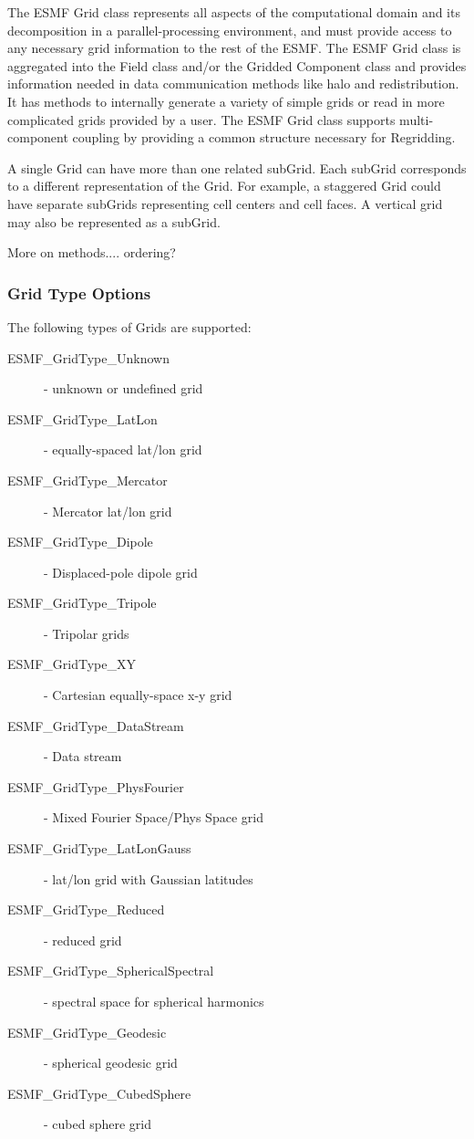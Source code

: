 %


The ESMF Grid class represents all aspects of the computational domain and its
decomposition in a parallel-processing environment, and must provide access to
any necessary grid information to the rest of the ESMF.  The ESMF Grid class
is aggregated into the Field class and/or the Gridded Component class
and provides information needed in data communication methods like halo and
redistribution.  It has methods to internally generate a variety of
simple grids or read in more complicated grids provided by a user.  The
ESMF Grid class supports multi-component coupling by providing a common
structure necessary for Regridding.

A single Grid can have more than one related subGrid.  Each subGrid corresponds to
a different representation of the Grid.  For example, a staggered Grid could
have separate subGrids representing cell centers and cell faces.  A vertical
grid may also be represented as a subGrid.

More on methods....   ordering?

\subsubsection{Grid Type Options}
The following types of Grids are supported:
\begin{description}
   \item[ESMF\_GridType\_Unknown] - unknown or undefined grid
   \item[ESMF\_GridType\_LatLon] - equally-spaced lat/lon grid
   \item[ESMF\_GridType\_Mercator] -  Mercator lat/lon grid
   \item[ESMF\_GridType\_Dipole] - Displaced-pole dipole grid
   \item[ESMF\_GridType\_Tripole] - Tripolar grids
   \item[ESMF\_GridType\_XY] - Cartesian equally-space x-y grid
   \item[ESMF\_GridType\_DataStream] - Data stream
   \item[ESMF\_GridType\_PhysFourier] - Mixed Fourier Space/Phys Space grid
   \item[ESMF\_GridType\_LatLonGauss] - lat/lon grid with Gaussian latitudes
   \item[ESMF\_GridType\_Reduced] - reduced grid
   \item[ESMF\_GridType\_SphericalSpectral] - spectral space for spherical harmonics
   \item[ESMF\_GridType\_Geodesic] - spherical geodesic grid
   \item[ESMF\_GridType\_CubedSphere] - cubed sphere grid
\end{description}

